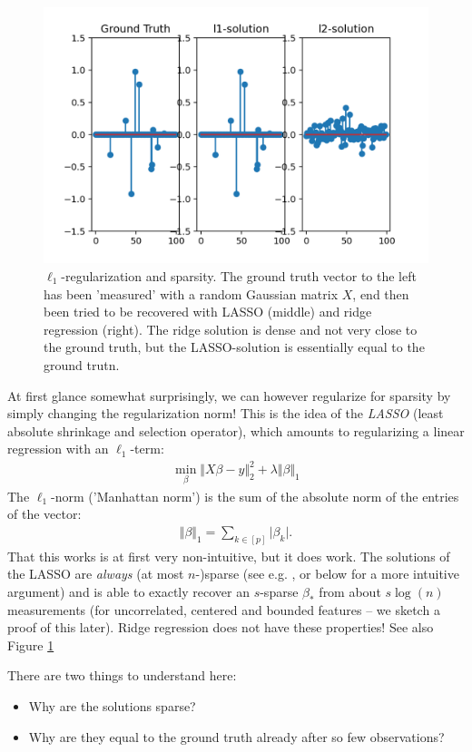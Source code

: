 \documentclass{article}
\newcommand{\abs}[1]{\vert #1 \vert}
\newcommand{\norm}[1]{\Vert #1 \Vert}
\begin{document}
\begin{figure}
    \centering
    \includegraphics[width=0.5\linewidth]{graphics/l1sol.png}
    \caption{$\ell_1$-regularization and sparsity. The ground truth vector to the left has been 'measured' with a random Gaussian matrix $X$, end then been tried to be recovered with LASSO (middle) and ridge regression (right). The ridge solution is dense and not very close to the ground truth, but the LASSO-solution is essentially equal to the ground trutn.}
    \label{fig:l1sol}
\end{figure}

At first glance somewhat surprisingly, we can however regularize for sparsity by simply changing the regularization norm! This is the idea of the \emph{LASSO} (least absolute shrinkage and selection operator), which amounts to regularizing a linear regression with an $\ell_1$-term:
\begin{align} \label{eq:lasso}
    \min_{\beta} \norm{X\beta-y}_2^2 + \lambda \norm{\beta}_1
\end{align}
The $\ell_1$-norm ('Manhattan norm') is the sum of the absolute norm of the entries of the vector:
\begin{align*}
    \norm{\beta}_1 = \sum_{k \in [p]} \abs{\beta_k}.
\end{align*}
That this works is at first very non-intuitive, but it does work. The solutions of the LASSO are \emph{always} (at most $n$-)sparse (see e.g. \cite[Th.6]{UnserStructure}, or below for a more intuitive argument) and is able to exactly recover an $s$-sparse $\beta_*$ from about $s\log(n)$ measurements (for uncorrelated, centered and bounded features -- we sketch a proof of this later). Ridge regression does not have these properties! See also Figure \ref{fig:l1sol}

There are two things to understand here: 
\begin{itemize}
    \item Why are the solutions sparse?
    \item Why are they equal to the ground truth already after so few observations?
\end{itemize}
\end{document}
